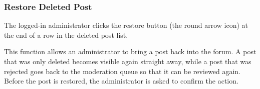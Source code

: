 \subsubsection{Restore Deleted Post}

 The logged-in administrator clicks the restore button (the round arrow icon) at the end of a row in the deleted post list.

 This function allows an administrator to bring a post back into the forum. A post that was only deleted becomes visible again straight away, while a post that was rejected goes back to the moderation queue so that it can be reviewed again. Before the post is restored, the administrator is asked to confirm the action.


